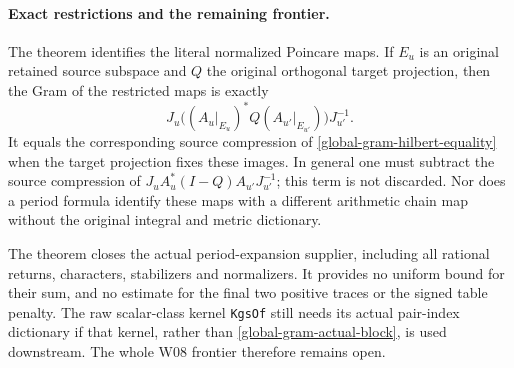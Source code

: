\paragraph{Exact restrictions and the remaining frontier.}
The theorem identifies the literal normalized Poincare maps.
If $E_u$ is an original retained source subspace and $Q$ the
original orthogonal target projection, then the Gram of the
restricted maps is exactly
\[
 J_u\bigl((A_u|_{E_u})^*Q(A_{u'}|_{E_{u'}})\bigr)J_{u'}^{-1}.
\]
It equals the corresponding source compression of
\eqref{global-gram-hilbert-equality} when the target projection
fixes these images.  In general one must subtract the source
compression of $J_uA_u^*(I-Q)A_{u'}J_{u'}^{-1}$; this term is
not discarded.  Nor does a period formula identify these maps
with a different arithmetic chain map without the original
integral and metric dictionary.

The theorem closes the actual period-expansion supplier, including
all rational returns, characters, stabilizers and normalizers.
It provides no uniform bound for their sum, and no estimate for
the final two positive traces or the signed table penalty.
The raw scalar-class kernel \texttt{KgsOf} still needs its actual
pair-index dictionary if that kernel, rather than
\eqref{global-gram-actual-block}, is used downstream.  The whole
W08 frontier therefore remains open.
